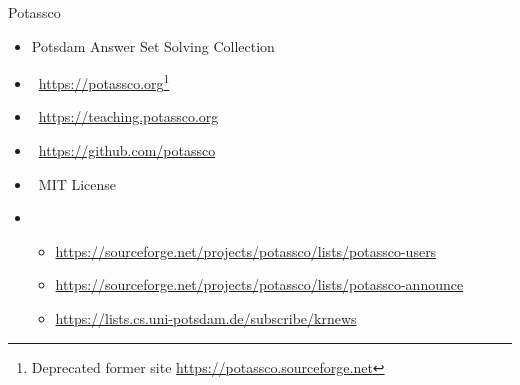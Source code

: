 \begin{frame}{Potassco}
  \bigskip
  \begin{itemize}
  \item Potsdam Answer Set Solving Collection
    \medskip
  \item {}     \ \url{https://potassco.org}\footnote{Deprecated former site \url{https://potassco.sourceforge.net}}
  \item {} \ \url{https://teaching.potassco.org}
  \item {}  \ \url{https://github.com/potassco}
  \item {}  \ MIT License
    \medskip
  \item {}
    \begin{itemize}\scriptsize
    \item \url{https://sourceforge.net/projects/potassco/lists/potassco-users}
    \item \url{https://sourceforge.net/projects/potassco/lists/potassco-announce}
    \item \url{https://lists.cs.uni-potsdam.de/subscribe/krnews}
    \end{itemize}
  \end{itemize}
\end{frame}
%
